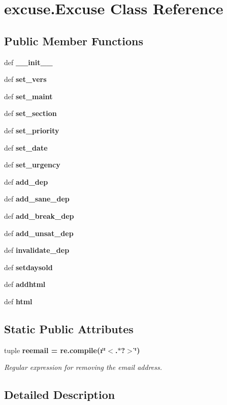 \section{excuse.Excuse Class Reference}
\label{classexcuse_1_1Excuse}
\subsection*{Public Member Functions}
\begin{CompactItemize}
\item 
def \bf{\_\-\_\-init\_\-\_\-}
\item 
def \bf{set\_\-vers}
\item 
def \bf{set\_\-maint}
\item 
def \bf{set\_\-section}
\item 
def \bf{set\_\-priority}
\item 
def \bf{set\_\-date}
\item 
def \bf{set\_\-urgency}
\item 
def \bf{add\_\-dep}
\item 
def \bf{add\_\-sane\_\-dep}
\item 
def \bf{add\_\-break\_\-dep}
\item 
def \bf{add\_\-unsat\_\-dep}
\item 
def \bf{invalidate\_\-dep}
\item 
def \bf{setdaysold}
\item 
def \bf{addhtml}
\item 
def \bf{html}
\end{CompactItemize}
\subsection*{Static Public Attributes}
\begin{CompactItemize}
\item 
tuple \bf{reemail} = re.compile(r\char`\"{}$<$.$\ast$?$>$\char`\"{})\label{classexcuse_1_1Excuse_bb15f55eed8f034db8a64b4ddc46460d}

\begin{CompactList}\small\item\em Regular expression for removing the email address. \item\end{CompactList}\end{CompactItemize}


\subsection{Detailed Description}


